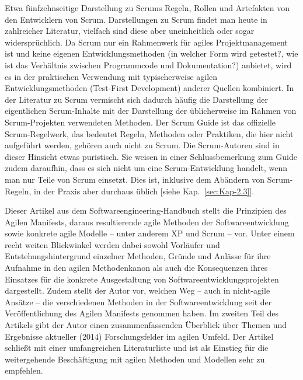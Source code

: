 {Etwa fünfzehnseitige Darstellung zu Scrums Regeln, Rollen und Artefakten von den Entwicklern von Scrum. Darstellungen zu Scrum findet man heute in zahlreicher Literatur, vielfach sind diese aber uneinheitlich oder sogar widersprüchlich. Da Scrum nur ein Rahmenwerk für agiles Projektmanagement ist und keine eigenen Entwicklungsmethoden (\zb in welcher Form wird getestet?, wie ist das Verhältnis zwischen Programmcode und Dokumentation?) anbietet, wird es in der praktischen Verwendung mit typischerweise agilen Entwicklungsmethoden (\zb Test-First Development) anderer Quellen kombiniert. In der Literatur zu Scrum vermischt sich dadurch häufig die Darstellung der eigentlichen Scrum-Inhalte mit der Darstellung der üblicherweise im Rahmen von Scrum-Projekten verwendeten Methoden. Der Scrum Guide ist das offizielle Scrum-Regelwerk, das bedeutet Regeln, Methoden oder Praktiken, die hier nicht aufgeführt werden, gehören auch nicht zu Scrum. Die Scrum-Autoren sind in dieser Hinsicht etwas puristisch. Sie weisen in einer Schluss\-bemerkung zum Guide zudem daraufhin, dass es sich nicht um eine Scrum-Entwicklung handelt, wenn man nur Teile von Scrum einsetzt. Dies ist, inklusive dem Abändern von Scrum-Regeln, in der Praxis aber durchaus üblich [siehe Kap.~\ref{sec:Kap-2.3}].}

{Dieser Artikel aus dem Softwareengineering-Handbuch \cite{gon14} stellt die Prinzipien des Agilen Manifests, daraus resultierende agile Methoden der Softwareentwicklung sowie konkrete agile Modelle – unter anderem XP und Scrum – vor. Unter einem recht weiten Blickwinkel werden dabei sowohl Vorläufer und Entstehungshintergrund einzelner Methoden, Gründe und Anlässe für ihre Aufnahme in den agilen Methodenkanon als auch die Konsequenzen ihres Einsatzes für die konkrete Ausgestaltung von Softwareentwicklungsprojekten dargestellt. Zudem stellt der Autor vor, welchen Weg – auch in nicht-agile Ansätze – die verschiedenen Methoden in der Softwareentwicklung seit der Veröffentlichung des Agilen Manifests genommen haben. Im zweiten Teil des Artikels gibt der Autor einen zusammenfassenden Überblick über Themen und Ergebnisse aktueller (2014) Forschungsfelder im agilen Umfeld. Der Artikel schließt mit einer umfangreichen Literaturliste und ist als Einstieg für die weitergehende Beschäftigung mit agilen Methoden und Modellen sehr zu empfehlen.}

